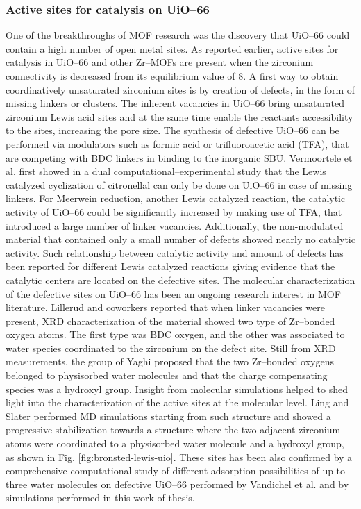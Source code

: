 \subsubsection*{Active sites for catalysis on UiO--66}
One of the breakthroughs of MOF research was the discovery that UiO--66 could contain a high number of open metal sites. As reported earlier, active sites for catalysis in UiO--66 and other Zr--MOFs are present when the zirconium connectivity is decreased from its equilibrium value of 8. 
\npar
A first way to obtain coordinatively unsaturated zirconium sites is by creation of defects, in the form of missing linkers or clusters. The inherent vacancies in UiO--66 bring unsaturated zirconium Lewis acid sites\cite{wu2013unusual, shearer2014tuned, vermoortele2013synthesis, vandichel2015active, liu2016probing} and at the same time enable the reactants accessibility to the sites, increasing the pore size. The synthesis of defective UiO--66 can be performed via modulators such as formic acid or trifluoroacetic acid (TFA), that are competing with BDC linkers in binding to the inorganic SBU. 
Vermoortele et al. first showed in a dual computational--experimental study that the Lewis catalyzed cyclization of citronellal can only be done on UiO--66 in case of missing linkers\cite{vermoortele2012electronic}. For Meerwein reduction, another Lewis catalyzed reaction, the catalytic activity of UiO--66 could be significantly increased by making use of TFA, that introduced a large number of linker vacancies. Additionally, the non-modulated material that contained only a small number of defects showed nearly no catalytic activity\cite{vermoortele2013synthesis}. Such relationship between catalytic activity and amount of defects has been reported for different Lewis catalyzed reactions giving evidence that the catalytic centers are located on the defective sites. 
\npar
The molecular characterization of the defective sites on UiO--66 has been an ongoing research interest in MOF literature. Lillerud and coworkers \cite{oien2014detailed} reported that when linker vacancies were present, XRD characterization of the material showed two type of Zr--bonded oxygen atoms. The first type was BDC oxygen, and the other was associated to water species coordinated to the zirconium on the defect site. Still from XRD measurements, the group of Yaghi \cite{trickett2015definitive} proposed that the two Zr--bonded oxygens belonged to physisorbed water molecules and that the charge compensating species was a hydroxyl group. Insight from molecular simulations helped to shed light into the characterization of the active sites at the molecular level. Ling and Slater \cite{ling2016dynamic} performed MD simulations starting from such structure and showed a progressive stabilization towards a structure where the two adjacent zirconium atoms were coordinated to a physisorbed water molecule and a hydroxyl group, as shown in Fig. \ref{fig:bronsted-lewis-uio}. These sites has been also confirmed by a comprehensive computational study of different adsorption possibilities of up to three water molecules on defective UiO--66 performed by Vandichel et al. \cite{vandichel2016water} and by simulations performed in this work of thesis. 
